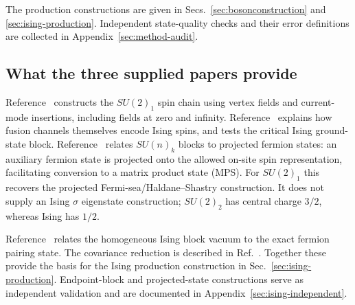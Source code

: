 The production constructions are given in Secs.~\ref{sec:bosonconstruction}
and \ref{sec:ising-production}. Independent state-quality
checks and their error definitions are collected in
Appendix~\ref{sec:method-audit}.

\subsection{What the three supplied papers provide}
Reference~\cite{Herwerth} constructs the $SU(2)_1$ spin chain using vertex
fields and current-mode insertions, including fields at zero and infinity.
Reference~\cite{Montes2016} explains how fusion channels themselves encode
Ising spins, and tests the critical Ising ground-state block.
Reference~\cite{Liu} relates $SU(n)_k$ blocks to projected fermion states:
an auxiliary fermion state is projected onto the allowed on-site spin
representation, facilitating conversion to a matrix product state (MPS).
For $SU(2)_1$ this recovers the projected Fermi-sea/Haldane--Shastry
construction. It does not supply an Ising $\sigma$ eigenstate construction;
$SU(2)_2$ has central charge $3/2$, whereas Ising has $1/2$.

Reference~\cite{Montes2017} relates the homogeneous Ising block vacuum
to the exact fermion pairing state. The covariance reduction is described
in Ref.~\cite{PeschelEisler}. Together these provide the basis for the
Ising production construction in Sec.~\ref{sec:ising-production}. Endpoint-block and projected-state
constructions serve as independent validation and are documented in
Appendix~\ref{sec:ising-independent}.

